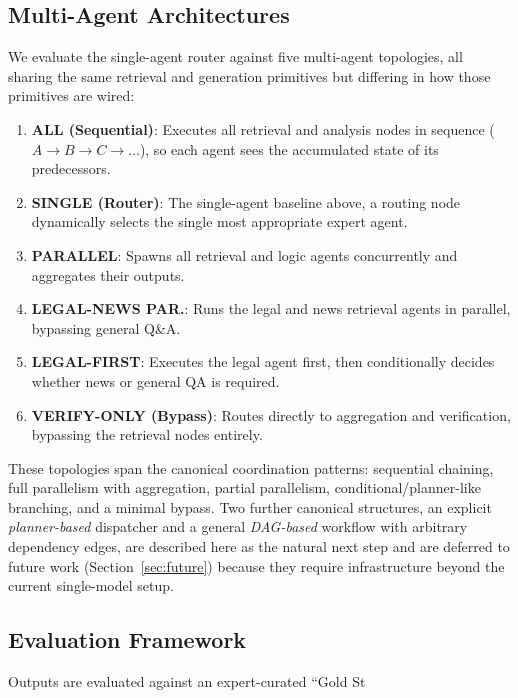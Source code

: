 \documentclass[journal,10pt,compsoc,onecolumn]{IEEEtran}
\begin{document}
\subsection{Multi-Agent Architectures}
We evaluate the single-agent router against five multi-agent topologies, all sharing the same retrieval and generation primitives but differing in how those primitives are wired:
\begin{enumerate}
    \item \textbf{ALL (Sequential)}: Executes all retrieval and analysis nodes in sequence ($A \rightarrow B \rightarrow C \rightarrow \dots$), so each agent sees the accumulated state of its predecessors.
    \item \textbf{SINGLE (Router)}: The single-agent baseline above, a routing node dynamically selects the single most appropriate expert agent.
    \item \textbf{PARALLEL}: Spawns all retrieval and logic agents concurrently and aggregates their outputs.
    \item \textbf{LEGAL-NEWS PAR.}: Runs the legal and news retrieval agents in parallel, bypassing general Q\&A.
    \item \textbf{LEGAL-FIRST}: Executes the legal agent first, then conditionally decides whether news or general QA is required.
    \item \textbf{VERIFY-ONLY (Bypass)}: Routes directly to aggregation and verification, bypassing the retrieval nodes entirely.
\end{enumerate}
These topologies span the canonical coordination patterns: sequential chaining, full parallelism with aggregation, partial parallelism, conditional/planner-like branching, and a minimal bypass. Two further canonical structures, an explicit \emph{planner-based} dispatcher and a general \emph{DAG-based} workflow with arbitrary dependency edges, are described here as the natural next step and are deferred to future work (Section~\ref{sec:future}) because they require infrastructure beyond the current single-model setup.

\subsection{Evaluation Framework}
Outputs are evaluated against an expert-curated ``Gold St
\end{document}
